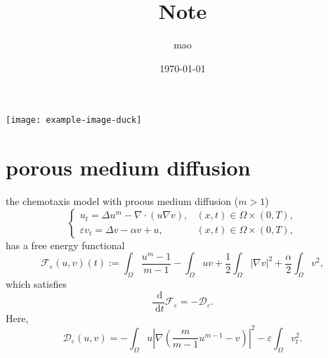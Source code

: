 \documentclass[en,hazy,screen,blue,14pt]{elegantnote}
\title{Note}
\author{mao}
\institute{seu}
\date{\today}
\numberwithin{dummy}{section}
\newcommand{\dd}{\;\mathrm{d}}
\begin{document}
\maketitle
\centerline{\texttt{[image: example-image-duck]}}

%

\section{porous medium diffusion}
the chemotaxis model with proous medium diffusion ($m>1$)
\begin{equation}
	\begin{cases}
		u_t = \Delta u^m - \nabla \cdot ( u\nabla v), & (x,t)\in\Omega\times(0,T),\\
		\varepsilon v_t = \Delta v - \alpha v + u, & (x,t)\in\Omega\times(0,T),
	\end{cases}
\end{equation}
has a free energy functional
\begin{equation}
	\mathcal{F}_\varepsilon(u,v)(t) :=  \int_\Omega \frac{u^m-1}{m-1} - \int_\Omega uv 
		+ \frac{1}{2}\int_\Omega |\nabla v|^2 + \frac{\alpha}{2}\int_\Omega v^2,
\end{equation}
which satisfies 
\begin{equation}
	\frac{\dd}{\dd t}\mathcal{F}_\varepsilon = - \mathcal{D}_\varepsilon.
\end{equation}
Here, 
\begin{equation*}
	\mathcal{D}_\varepsilon(u,v) 
		= - \int_\Omega u\left|\nabla\left(\frac{m}{m-1}u^{m-1} - v\right)\right|^2
			- \varepsilon\int_\Omega v_t^2.
\end{equation*}
\end{document}
